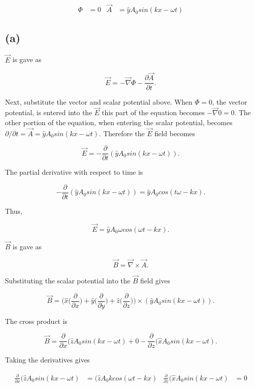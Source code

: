 \documentclass[11pt]{article}
\begin{document}
\begin{align*}
    \Phi &= 0 & \Vec{A} &= \hat{y}A_{0}sin(kx - \omega t)
\end{align*}

\subsection*{(a)}

$\Vec{E}$ is gave as 

$$
\Vec{E} = -\Vec{\nabla} \Phi - \frac{\partial \vec{A}}{\partial t}.
$$

Next, substitute the vector and scalar potential above. When $\Phi = 0$, the vector potential, is entered into the $\Vec{E}$ this part of the equation becomes $-\Vec{\nabla} 0 = 0$. The other portion of the equation, when entering the scalar potential, becomes $\partial/\partial t = \Vec{A} = \hat{y}A_{0}sin(k x - \omega t)$. Therefore the $\Vec{E}$ field becomes 

$$
\Vec{E} = -\frac{\partial }{\partial t} (\hat{y}A_{0}sin(k x - \omega t)).
$$

The partial derivative with respect to time is 

$$
-\frac{\partial }{\partial t} (\hat{y}A_{0}sin(k x - \omega t)) = \hat{y}A_{0}cos(t\omega - k x).
$$

Thus,

$$
\Vec{E} = \hat{y}A_{0}\omega cos(\omega t - k x).
$$

$\Vec{B}$ is gave as 

$$
\Vec{B} = \Vec{\nabla} \times \vec{A}.
$$

Substituting the scalar potential into the $\Vec{B}$ field gives

$$
\Vec{B} = \Big( \hat{x}\Big(\frac{\partial}{\partial x} \Big) + \hat{y}\Big(\frac{\partial}{\partial y} \Big) + \hat{z}\Big(\frac{\partial}{\partial z} \Big)\Big) \times (\hat{y}A_{0}sin(kx - \omega t)).
$$

The cross product is

$$
\Vec{B} = \frac{\partial}{\partial x} (\hat{z}A_{0}sin(kx - \omega t) + 0 - \frac{\partial}{\partial z}  (\hat{x}A_{0}sin(kx - \omega t).
$$

Taking the derivatives gives

\begin{align*}
    \frac{\partial}{\partial x} (\hat{z}A_{0}sin(kx - \omega t) &= (\hat{z}A_{0}k cos(\omega t - kx) & \frac{\partial}{\partial z}  (\hat{x}A_{0}sin(kx - \omega t) &= 0
\end{align*}
\end{document}
